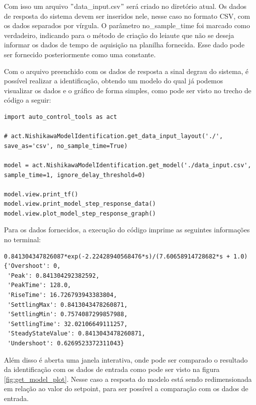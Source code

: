 Com isso um arquivo \("\)data\_input.csv\("\) será criado no diretório atual.
Os dados de resposta do sistema devem ser inseridos nele, nesse caso no formato CSV, com os dados separados por vírgula.
O parâmetro no\_sample\_time foi marcado como verdadeiro, indicando para o método de criação do leiaute que não
se deseja informar os dados de tempo de aquisição na planilha fornecida.
Esse dado pode ser fornecido posteriormente como uma constante.

Com o arquivo preenchido com os dados de resposta a sinal degrau do sistema, é possível realizar a identificação,
obtendo um modelo do qual já podemos visualizar os dados e o gráfico de forma simples, como pode ser visto no trecho
de código a seguir:

\begin{lstlisting}[label={lst:get_model}]
import auto_control_tools as act

# act.NishikawaModelIdentification.get_data_input_layout('./', save_as='csv', no_sample_time=True)

model = act.NishikawaModelIdentification.get_model('./data_input.csv', sample_time=1, ignore_delay_threshold=0)

model.view.print_tf()
model.view.print_model_step_response_data()
model.view.plot_model_step_response_graph()
\end{lstlisting}

Para os dados fornecidos, a execução do código imprime as seguintes informações no terminal:
\begin{lstlisting}[label={lst:get_model_out}]
0.841304347826087*exp(-2.22428940568476*s)/(7.60658914728682*s + 1.0)
{'Overshoot': 0,
 'Peak': 0.841304292382592,
 'PeakTime': 128.0,
 'RiseTime': 16.726793943383804,
 'SettlingMax': 0.8413043478260871,
 'SettlingMin': 0.7574087299857988,
 'SettlingTime': 32.02106649111257,
 'SteadyStateValue': 0.8413043478260871,
 'Undershoot': 0.6269523372311043}
\end{lstlisting}

Além disso é aberta uma janela interativa, onde pode ser comparado o resultado da identificação com os dados de entrada
como pode ser visto na figura \ref{fig:get_model_plot}.
Nesse caso a resposta do modelo está sendo redimensionada em relação ao valor do setpoint, para ser possível a
comparação com os dados de entrada.

